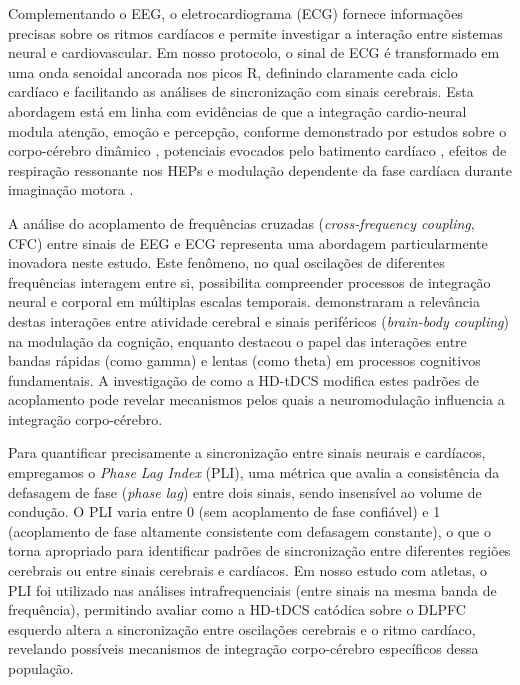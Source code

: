 Complementando o EEG, o eletrocardiograma (ECG) fornece informações precisas sobre os ritmos cardíacos e permite investigar a interação entre sistemas neural e cardiovascular. Em nosso protocolo, o sinal de ECG é transformado em uma onda senoidal ancorada nos picos R, definindo claramente cada ciclo cardíaco e facilitando as análises de sincronização com sinais cerebrais. Esta abordagem está em linha com evidências de que a integração cardio-neural modula atenção, emoção e percepção, conforme demonstrado por estudos sobre o corpo-cérebro dinâmico \cite{criscuolo2022cognition}, potenciais evocados pelo batimento cardíaco \cite{park2018neural,banelli2020skipping}, efeitos de respiração ressonante nos HEPs \cite{mackinnon2013utilizing} e modulação dependente da fase cardíaca durante imaginação motora \cite{lai2024cardiac}.

A análise do acoplamento de frequências cruzadas (\textit{cross-frequency coupling}, CFC) entre sinais de EEG e ECG representa uma abordagem particularmente inovadora neste estudo. Este fenômeno, no qual oscilações de diferentes frequências interagem entre si, possibilita compreender processos de integração neural e corporal em múltiplas escalas temporais.  demonstraram a relevância destas interações entre atividade cerebral e sinais periféricos (\textit{brain-body coupling}) na modulação da cognição, enquanto  destacou o papel das interações entre bandas rápidas (como gamma) e lentas (como theta) em processos cognitivos fundamentais. A investigação de como a HD-tDCS modifica estes padrões de acoplamento pode revelar mecanismos pelos quais a neuromodulação influencia a integração corpo-cérebro.

Para quantificar precisamente a sincronização entre sinais neurais e cardíacos, empregamos o \textit{Phase Lag Index} (PLI), uma métrica que avalia a consistência da defasagem de fase (\textit{phase lag}) entre dois sinais, sendo insensível ao volume de condução. O PLI varia entre 0 (sem acoplamento de fase confiável) e 1 (acoplamento de fase altamente consistente com defasagem constante), o que o torna apropriado para identificar padrões de sincronização entre diferentes regiões cerebrais ou entre sinais cerebrais e cardíacos. Em nosso estudo com atletas, o PLI foi utilizado nas análises intrafrequenciais (entre sinais na mesma banda de frequência), permitindo avaliar como a HD-tDCS catódica sobre o DLPFC esquerdo altera a sincronização entre oscilações cerebrais e o ritmo cardíaco, revelando possíveis mecanismos de integração corpo-cérebro específicos dessa população.

